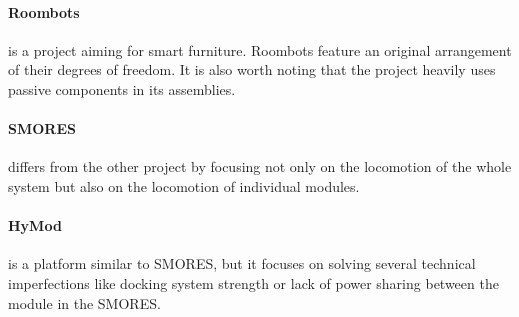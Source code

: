 \paragraph{Roombots} \cite{bonardi_locomotion_2012} is a project aiming for
smart furniture. Roombots feature an original arrangement of their degrees of
freedom. It is also worth noting that the project heavily uses passive
components in its assemblies.

\paragraph{SMORES} \cite{davey_emulating_2012} differs from the other project by
focusing not only on the locomotion of the whole system but also on the
locomotion of individual modules.

\paragraph{HyMod} \cite{gros_hymod:_2018} is a platform similar to SMORES, but
it focuses on solving several technical imperfections like docking system
strength or lack of power sharing between the module in the SMORES.
